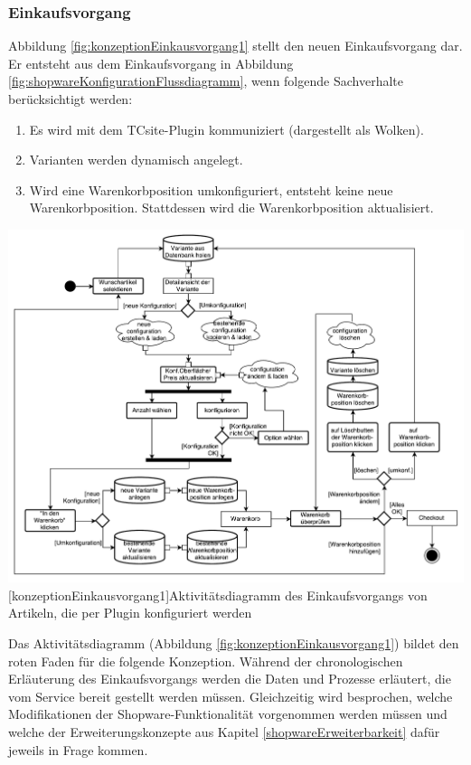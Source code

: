 \documentclass[11pt, a4paper, titlepage, listof=totoc, bibliography=totoc, index=totoc, twoside, openright, headings=normal, draft]{scrreprt}
\begin{document}
\subsubsection{Einkaufsvorgang}
Abbildung \ref{fig:konzeptionEinkausvorgang1} stellt den neuen Einkaufsvorgang dar. Er entsteht aus dem Einkaufsvorgang in Abbildung \ref{fig:shopwareKonfigurationFlussdiagramm}, wenn folgende Sachverhalte berücksichtigt werden:
\begin{enumerate}
\item Es wird mit dem TCsite-Plugin kommuniziert (dargestellt als Wolken).
\item Varianten werden dynamisch angelegt.
\item Wird eine Warenkorbposition umkonfiguriert, entsteht keine neue Warenkorbposition. Stattdessen wird die Warenkorbposition aktualisiert.
\end{enumerate}

\vspace{1em}
\begin{minipage}{\linewidth}
	\centering
	\includegraphics[width=1\linewidth]{Abbildungen/konzeptionEinkausvorgang1.pdf}
	[konzeptionEinkausvorgang1]{Aktivitätsdiagramm des Einkaufsvorgangs von Artikeln, die per Plugin konfiguriert werden}
	\label{fig:konzeptionEinkausvorgang1}
\end{minipage}
\vspace{1em}

Das Aktivitätsdiagramm (Abbildung \ref{fig:konzeptionEinkausvorgang1}) bildet den \glqq roten Faden\grqq{} für die folgende Konzeption. Während der chronologischen Erläuterung des Einkaufsvorgangs werden die Daten und Prozesse erläutert, die vom Service bereit gestellt werden müssen. Gleichzeitig wird besprochen, welche Modifikationen der Shopware-Funktionalität vorgenommen werden müssen und welche der Erweiterungskonzepte aus Kapitel \ref{shopwareErweiterbarkeit} dafür jeweils in Frage kommen.
\end{document}
